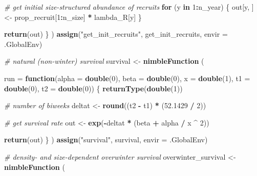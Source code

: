 \documentclass[
]{article}
\newenvironment{Shaded}{\begin{snugshade}}{\end{snugshade}}
\newcommand{\AttributeTok}[1]{\textcolor[rgb]{0.13,0.29,0.53}{#1}}
\newcommand{\CommentTok}[1]{\textcolor[rgb]{0.56,0.35,0.01}{\textit{#1}}}
\newcommand{\ControlFlowTok}[1]{\textcolor[rgb]{0.13,0.29,0.53}{\textbf{#1}}}
\newcommand{\DecValTok}[1]{\textcolor[rgb]{0.00,0.00,0.81}{#1}}
\newcommand{\FloatTok}[1]{\textcolor[rgb]{0.00,0.00,0.81}{#1}}
\newcommand{\FunctionTok}[1]{\textcolor[rgb]{0.13,0.29,0.53}{\textbf{#1}}}
\newcommand{\NormalTok}[1]{#1}
\newcommand{\OtherTok}[1]{\textcolor[rgb]{0.56,0.35,0.01}{#1}}
\newcommand{\SpecialCharTok}[1]{\textcolor[rgb]{0.81,0.36,0.00}{\textbf{#1}}}
\newcommand{\StringTok}[1]{\textcolor[rgb]{0.31,0.60,0.02}{#1}}
\begin{document}
\begin{Shaded}
\begin{Highlighting}[]
      \CommentTok{\# get initial size{-}structured abundance of recruits}
      \ControlFlowTok{for}\NormalTok{ (y }\ControlFlowTok{in} \DecValTok{1}\SpecialCharTok{:}\NormalTok{n\_year) \{}
\NormalTok{        out[y, ] }\OtherTok{\textless{}{-}}\NormalTok{ prop\_recruit[}\DecValTok{1}\SpecialCharTok{:}\NormalTok{n\_size] }\SpecialCharTok{*}\NormalTok{ lambda\_R[y]}
\NormalTok{      \}}
      
      \FunctionTok{return}\NormalTok{(out)}
\NormalTok{    \}}
\NormalTok{  )}
  \FunctionTok{assign}\NormalTok{(}\StringTok{"get\_init\_recruits"}\NormalTok{, get\_init\_recruits, }\AttributeTok{envir =}\NormalTok{ .GlobalEnv)}
  
  \CommentTok{\# natural (non{-}winter) survival}
\NormalTok{  survival }\OtherTok{\textless{}{-}} \FunctionTok{nimbleFunction}\NormalTok{ (}
    
    \AttributeTok{run =} \ControlFlowTok{function}\NormalTok{(}\AttributeTok{alpha =} \FunctionTok{double}\NormalTok{(}\DecValTok{0}\NormalTok{), }\AttributeTok{beta =} \FunctionTok{double}\NormalTok{(}\DecValTok{0}\NormalTok{), }\AttributeTok{x =} \FunctionTok{double}\NormalTok{(}\DecValTok{1}\NormalTok{),}
                   \AttributeTok{t1 =} \FunctionTok{double}\NormalTok{(}\DecValTok{0}\NormalTok{), }\AttributeTok{t2 =} \FunctionTok{double}\NormalTok{(}\DecValTok{0}\NormalTok{))}
\NormalTok{    \{}
      \FunctionTok{returnType}\NormalTok{(}\FunctionTok{double}\NormalTok{(}\DecValTok{1}\NormalTok{))}
      
      \CommentTok{\# number of biweeks}
\NormalTok{      deltat }\OtherTok{\textless{}{-}} \FunctionTok{round}\NormalTok{((t2 }\SpecialCharTok{{-}}\NormalTok{ t1) }\SpecialCharTok{*}\NormalTok{ (}\FloatTok{52.1429} \SpecialCharTok{/} \DecValTok{2}\NormalTok{))}
      
      \CommentTok{\# get survival rate}
\NormalTok{      out }\OtherTok{\textless{}{-}} \FunctionTok{exp}\NormalTok{(}\SpecialCharTok{{-}}\NormalTok{deltat }\SpecialCharTok{*}\NormalTok{ (beta }\SpecialCharTok{+}\NormalTok{ alpha }\SpecialCharTok{/}\NormalTok{ x }\SpecialCharTok{\^{}} \DecValTok{2}\NormalTok{))}
      
      \FunctionTok{return}\NormalTok{(out)}
\NormalTok{    \}}
\NormalTok{  )}
  \FunctionTok{assign}\NormalTok{(}\StringTok{"survival"}\NormalTok{, survival, }\AttributeTok{envir =}\NormalTok{ .GlobalEnv)}
  
  \CommentTok{\# density{-} and size{-}dependent overwinter survival}
\NormalTok{  overwinter\_survival }\OtherTok{\textless{}{-}} \FunctionTok{nimbleFunction}\NormalTok{ (}
    

\end{Highlighting}
\end{Shaded}
\end{document}
